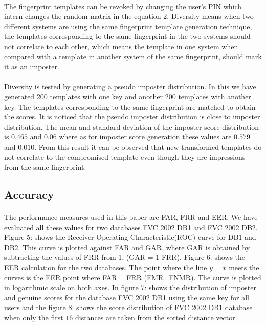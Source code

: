 \documentclass[14pt, oneside]{article}   	%
\begin{document}
\paragraph{}
The fingerprint templates can be revoked by changing the user's PIN which intern changes the random matrix in the equation-$2$.  Diversity means when two different systems are using the same fingerprint template generation technique, the templates corresponding to the same fingerprint in the two systems should not correlate to each other, which means the template in one system when compared with a template in another system of the same fingerprint, should mark it as an imposter.
\paragraph{}
Diversity is tested by generating a pseudo imposter distribution. In this we have generated 200 templates with one key and another 200 templates with another key. The templates corresponding to the same fingerprint are matched to obtain the scores. It is noticed that the pseudo imposter distribution is close to imposter distribution. The mean and standard deviation of the imposter score distribution is $0.465$ and $0.06$ where as for imposter score generation these values are $0.579$ and $0.010$. From this result it can be observed that new transformed templates do not correlate to the compromised template even though they are impressions from the same fingerprint.
\subsection{Accuracy}
\paragraph{}
The performance measures used in this paper are FAR, FRR and EER. We have evaluated all these values for two databases FVC 2002 DB1 and FVC 2002 DB2. Figure 5: shows the Receiver Operating Characteristic(ROC) curve for DB1 and DB2. This curve is plotted against FAR and GAR, where GAR is  obtained by subtracting the values of FRR from 1, (GAR = 1-FRR). Figure 6: shows the EER calculation for the two databases. The point where the line  $y=x$  meets the curves is the EER point where FAR$ = $FRR (FMR=FNMR). The curve is plotted in logarithmic scale on both axes. In figure 7: shows the distribution of imposter and genuine scores for the database FVC 2002 DB1 using the same key for all users and the figure 8: shows the score distribution of FVC 2002 DB1 database when only the first $16$ distances are taken from the sorted distance vector. 
\end{document}
